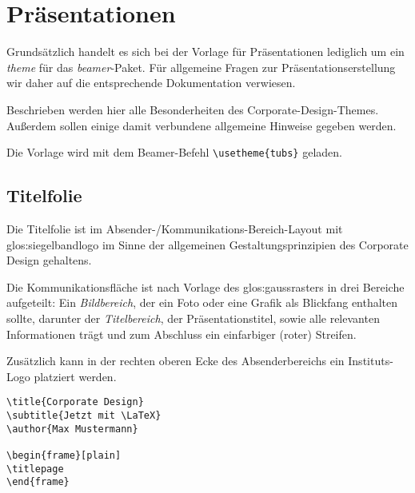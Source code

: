 \chapter{Präsentationen}


Grundsätzlich handelt es sich bei der Vorlage für Präsentationen lediglich um
ein \emph{theme} für das \emph{beamer}-Paket.
Für allgemeine Fragen zur Präsentationserstellung wir daher auf die
entsprechende Dokumentation\cite{beamer} verwiesen.

Beschrieben werden hier alle Besonderheiten des Corporate-Design-Themes.
Außerdem sollen einige damit verbundene allgemeine Hinweise gegeben werden.

Die Vorlage wird mit dem Beamer-Befehl \lstinline!\usetheme{tubs}! geladen.

\section{Titelfolie}

Die Titelfolie ist im Absender-/Kommunikations-Bereich-Layout mit
\gls{glos:siegelbandlogo} im Sinne der allgemeinen Gestaltungsprinzipien des
Corporate Design gehaltens.

Die Kommunikationsfläche ist nach Vorlage des \gls{glos:gaussraster}s
in drei Bereiche aufgeteilt:
Ein \emph{Bildbereich}, der ein Foto oder eine Grafik als Blickfang enthalten
sollte, darunter der \emph{Titelbereich}, der Präsentationstitel,
sowie alle relevanten Informationen trägt
und zum Abschluss ein einfarbiger (roter) Streifen.

Zusätzlich kann in der rechten oberen Ecke des Absenderbereichs ein
Instituts-Logo platziert werden.

\begin{minipage}{0.5\textwidth}
\begin{verbatim}
\title{Corporate Design}
\subtitle{Jetzt mit \LaTeX}
\author{Max Mustermann}

\begin{frame}[plain]
\titlepage
\end{frame}
\end{verbatim}
\end{minipage}
\begin{minipage}{0.5\textwidth}
\end{minipage}


